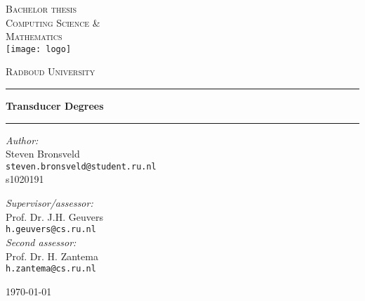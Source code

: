 \begin{titlepage}
	\begin{center}
	\textsc{\LARGE Bachelor thesis\\Computing Science \&\\Mathematics}\\[1.5cm]
	\texttt{[image: logo]}
	
	\vspace{0.4cm}
	\textsc{\Large Radboud University}\\[1cm]
	\hrule
	\vspace{0.4cm}
	\textbf{\huge Transducer Degrees}\\[0.4cm]
	\hrule
	\vspace{2cm}
	\begin{minipage}[t]{0.45\textwidth}
	\begin{flushleft} \large
	\textit{Author:}\\
	Steven Bronsveld\\
	\texttt{steven.bronsveld@student.ru.nl}\\
	s1020191
	\end{flushleft}
	\end{minipage}
	\begin{minipage}[t]{0.45\textwidth}
	\begin{flushright} \large
	\textit{Supervisor/assessor:}\\
	Prof. Dr. J.H. Geuvers\\
	\texttt{h.geuvers@cs.ru.nl}\\[1.3cm]
	\textit{Second assessor:}\\
	Prof. Dr. H. Zantema\\
	\texttt{h.zantema@cs.ru.nl}
	\end{flushright}
	\end{minipage}
	\vfill
	{\large \today}
	\end{center}
\end{titlepage}